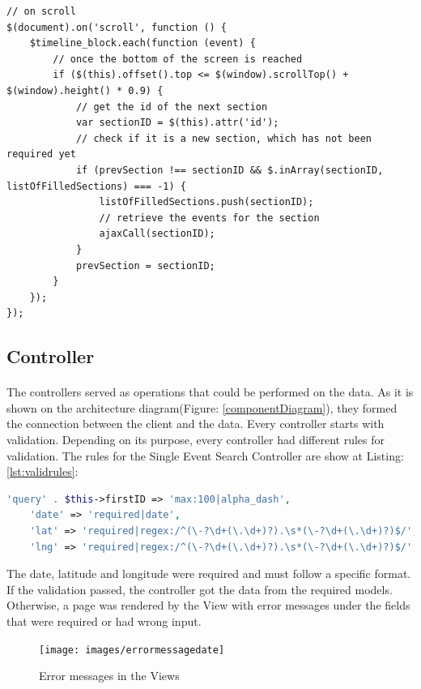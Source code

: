 \documentclass{l4proj}
\begin{document}
\begin{lstlisting}
// on scroll
$(document).on('scroll', function () {
	$timeline_block.each(function (event) {
		// once the bottom of the screen is reached
		if ($(this).offset().top <= $(window).scrollTop() + $(window).height() * 0.9) {
			// get the id of the next section
			var sectionID = $(this).attr('id');
			// check if it is a new section, which has not been required yet
			if (prevSection !== sectionID && $.inArray(sectionID, listOfFilledSections) === -1) {
				listOfFilledSections.push(sectionID);
				// retrieve the events for the section
				ajaxCall(sectionID);
			}
			prevSection = sectionID;
		}
	});
});
\end{lstlisting}

\subsection{Controller}
\label{subsec:controller}
\paragraph{}
The controllers served as operations that could be performed on the data. As it is shown on the architecture diagram(Figure: \ref{componentDiagram}), they formed the connection between the client and the data. Every controller starts with validation. Depending on its purpose, every controller had different rules for validation.
The rules for the Single Event Search Controller are show at Listing: \ref{lst:validrules}:
\begin{lstlisting}[caption={Validation Rules},label={lst:validrules},language=PHP]
    'query' . $this->firstID => 'max:100|alpha_dash',
    'date' => 'required|date',
    'lat' => 'required|regex:/^(\-?\d+(\.\d+)?).\s*(\-?\d+(\.\d+)?)$/',
    'lng' => 'required|regex:/^(\-?\d+(\.\d+)?).\s*(\-?\d+(\.\d+)?)$/',
\end{lstlisting}
The date, latitude and longitude were required and must follow a specific format. If the validation passed, the controller got the data from the required models. Otherwise, a page was rendered by the View with error messages under the fields that were required or had wrong input. 

\begin{figure}[H]
	\centering
	\texttt{[image: images/errormessagedate]}
	\label{errormessagedate}
	\caption{Error messages in the Views}
\end{figure}
\end{document}
